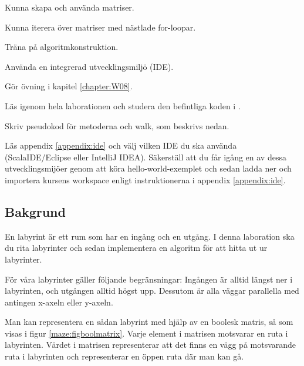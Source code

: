
\Lab{\LabWeekEIGHT}

\begin{Goals}
\item Kunna skapa och använda matriser.
\item Kunna iterera över matriser med nästlade for-loopar.
\item Träna på algoritmkonstruktion.
\item Använda en integrerad utvecklingsmiljö (IDE).
\end{Goals}

\begin{Preparations}
\item Gör övning {\tt \ExeWeekEIGHT} i kapitel \ref{chapter:W08}.

\item Läs igenom hela laborationen och studera den befintliga koden i .

\item Skriv pseudokod för metoderna  och {walk}, som beskrivs nedan.

\item Läs appendix \ref{appendix:ide} och välj vilken IDE du ska använda (ScalaIDE/Eclipse eller IntelliJ IDEA). Säkerställ att du får igång en av dessa utvecklingsmijöer genom att köra hello-world-exemplet och sedan ladda ner och importera kursens workspace enligt instruktionerna i appendix \ref{appendix:ide}.
\end{Preparations}

\subsection{Bakgrund}

En labyrint är ett rum som har en ingång och en utgång.  I denna laboration ska du rita labyrinter och sedan implementera en algoritm för att hitta ut ur labyrinter.

För våra labyrinter gäller följande begränsningar: Ingången är alltid längst ner i labyrinten, och utgången alltid högst upp. Dessutom är alla väggar parallella med antingen x-axeln eller y-axeln.

Man kan representera en sådan labyrint med hjälp av en boolesk matris, så som visas i figur \ref{maze:figboolmatrix}. Varje element i matrisen motsvarar en ruta i labyrinten. Värdet  i matrisen representerar att det finns en vägg på motsvarande ruta i labyrinten och  representerar en öppen ruta där man kan gå.

